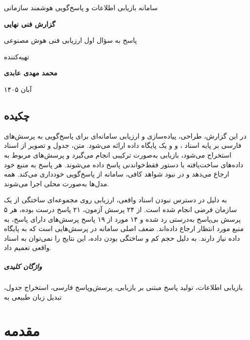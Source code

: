 \documentclass[a4paper,12pt,oneside]{book}
\newcommand{\reporttitle}{سامانه بازیابی اطلاعات و پاسخ‌گویی هوشمند سازمانی}
\newcommand{\en}[1]{\lr{#1}}
\begin{document}
\begin{titlepage}
\centering
\vspace*{35mm}
{\huge\titlefont \reporttitle\par}
\vskip 15mm
{\Large\bfseries گزارش فنی نهایی\par}
\vskip 4mm
{\large پاسخ به سؤال اول ارزیابی فنی هوش مصنوعی\par}
\vfill
{\large تهیه‌کننده\par}
\vskip 4mm
{\Large\bfseries محمد مهدی عابدی\par}
\vskip 15mm
{\large آبان ۱۴۰۵\par}
\vspace*{15mm}
\end{titlepage}

\clearpage
\thispagestyle{empty}
\section*{چکیده}

در این گزارش، طراحی، پیاده‌سازی و ارزیابی سامانه‌ای برای پاسخ‌گویی به پرسش‌های فارسی بر پایه اسناد \en{PDF}، \en{Word} و \en{Excel} و یک پایگاه داده ارائه می‌شود. متن، جدول و تصویر از اسناد استخراج می‌شود، بازیابی به‌صورت ترکیبی انجام می‌گیرد و پرسش‌های مربوط به داده‌های ساخت‌یافته با دستور \en{SQL} فقط‌خواندنی پاسخ داده می‌شوند. هر پاسخ به منبع خود ارجاع می‌دهد و در نبود شواهد کافی، سامانه از پاسخ‌گویی خودداری می‌کند. همه مدل‌ها به‌صورت محلی اجرا می‌شوند.

به دلیل در دسترس نبودن اسناد واقعی، ارزیابی روی مجموعه‌ای ساختگی از یک سازمان فرضی انجام شده است. از ۲۴ پرسش آزمون، ۲۱ پاسخ درست بوده، هر ۵ پرسش بی‌پاسخ به‌درستی رد شده و ۱۴ مورد از ۱۹ پاسخ پرسش‌های دارای پاسخ، به منبع مورد انتظار ارجاع داده‌اند. ضعف اصلی سامانه در پرسش‌هایی است که به پایگاه داده نیاز دارند. به دلیل حجم کم و ساختگی بودن داده، این نتایج را نمی‌توان به اسناد واقعی تعمیم داد.

\paragraph{واژگان کلیدی}
بازیابی اطلاعات، تولید پاسخ مبتنی بر بازیابی، پرسش‌وپاسخ فارسی، استخراج جدول، تبدیل زبان طبیعی به \en{SQL}

\clearpage
{}
\tableofcontents
\clearpage
\listoffigures
\listoftables
\clearpage
{}

\chapter{مقدمه}\label{ch:intro}
\end{document}
